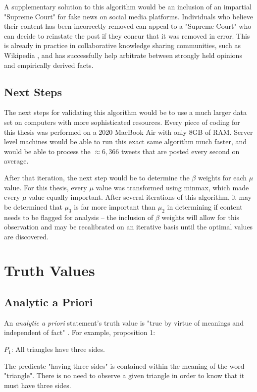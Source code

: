 \documentclass[preprint,review,12pt]{elsarticle}
\begin{document}
A supplementary solution to this algorithm would be an inclusion of an impartial "Supreme Court" for fake news on social media platforms. Individuals who believe their content has been incorrectly removed can appeal to a "Supreme Court" who can decide to reinstate the post if they concur that it was removed in error. This is already in practice in collaborative knowledge sharing communities, such as Wikipedia \cite{hara2016co}, and has successfully help arbitrate between strongly held opinions and empirically derived facts. 

\subsection{Next Steps}
The next steps for validating this algorithm would be to use a much larger data set on computers with more sophisticated resources. Every piece of coding for this thesis was performed on a 2020 MacBook Air with only 8GB of RAM. Server level machines would be able to run this exact same algorithm much faster, and would be able to process the $\approx 6,366$ tweets that are posted every second on average. 

After that iteration, the next step would be to determine the $\beta$ weights for each $\mu$ value. For this thesis, every $\mu$ value was transformed using minmax, which made every $\mu$ value equally important. After several iterations of this algorithm, it may be determined that $\mu_3$ is far more important than $\mu_2$ in determining if content needs to be flagged for analysis -- the inclusion of $\beta$ weights will allow for this observation and may be recalibrated on an iterative basis until the optimal values are discovered.


\appendix

\section{Truth Values}
\label{truthvalue appendix}
\subsection{Analytic a Priori}
An \textit{analytic a priori} statement's truth value is "true by virtue of meanings and independent of fact" \cite{quine1951main}. 
For example, proposition 1: \begin{center}
    $P_1$: All triangles have three sides.
\end{center}
The predicate "having three sides" is contained within the meaning of the word "triangle". There is no need to observe a given triangle in order to know that it must have three sides.
\end{document}
